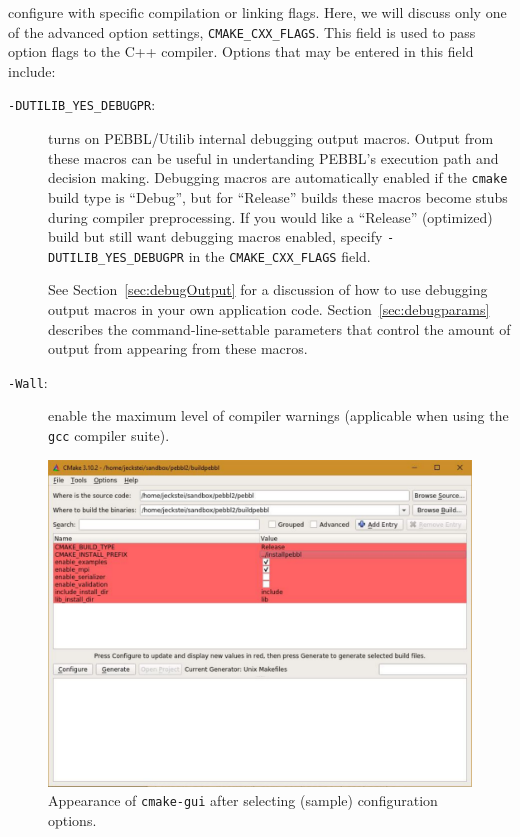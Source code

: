 configure with specific compilation or linking flags.  Here, we will discuss
only one of the advanced option settings, \texttt{CMAKE\_CXX\_FLAGS}.  This
field is used to pass option flags to the C++ compiler.  Options that may be
entered in this field include: \label{advancedoptions}
\begin{description}
\item[\texttt{-DUTILIB\_YES\_DEBUGPR}:]  turns on PEBBL/Utilib internal
debugging output macros.  Output from these macros can be useful in
undertanding PEBBL's execution path and decision making. Debugging macros are
automatically enabled if the \texttt{cmake} build type is ``Debug'', but for
``Release'' builds these macros become stubs during compiler preprocessing.
If you would like a ``Release'' (optimized) build but still want debugging
macros enabled, specify \texttt{-DUTILIB\_YES\_DEBUGPR} in the
\texttt{CMAKE\_CXX\_FLAGS} field.

See Section~\ref{sec:debugOutput} for a discussion of how to
use debugging output macros in your own application code. Section~\ref{sec:debugparams}
describes the command-line-settable parameters that control the amount of
output from appearing from these macros.
\item[\texttt{-Wall}:] enable the maximum level of compiler warnings (applicable 
when using the \texttt{gcc} compiler suite).
\end{description}

\begin{figure}[tpb]
\begin{center}
\includegraphics[height=0.45\textheight]{cmake3}
\vspace{-0.3in}
\end{center}{}
\caption{Appearance of \texttt{cmake-gui} after selecting (sample)
configuration options.
  \label{fig:cmake3}}
\end{figure}

